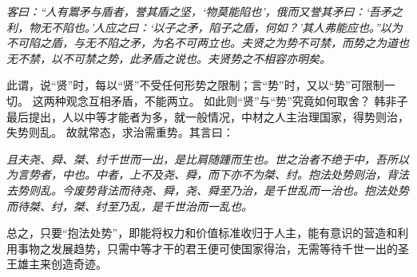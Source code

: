\documentclass[11pt]{article}
\begin{document}
\textit{客曰：“人有鬻矛与盾者，誉其盾之坚，‘物莫能陷也'，俄而又誉其矛曰：‘吾矛之利，物无不陷也。'人应之曰：‘以子之矛，陷子之盾，何如？'其人弗能应也。”以为不可陷之盾，与无不陷之矛，为名不可两立也。夫贤之为势不可禁，而势之为道也无不禁，以不可禁之势，此矛盾之说也。夫贤势之不相容亦明矣。}

此谓，说“贤”时，每以“贤”不受任何形势之限制；言“势”时，又以“势”可限制一切。
这两种观念互相矛盾，不能两立。
如此则“贤”与“势”究竟如何取舍？
韩非子最后提出，人以中等才能者为多，就一般情况，中材之人主治理国家，得势则治，失势则乱。
故就常态，求治需重势。其言曰：

\textit{且夫尧、舜、桀、纣千世而一出，是比肩随踵而生也。世之治者不绝于中，吾所以为言势者，中也。中者，上不及尧、舜，而下亦不为桀、纣。抱法处势则治，背法去势则乱。今废势背法而待尧、舜，尧、舜至乃治，是千世乱而一治也。抱法处势而待桀、纣，桀、纣至乃乱，是千世治而一乱也。}

总之，只要“抱法处势”，即能将权力和价值标准收归于人主，能有意识的营造和利用事物之发展趋势，只需中等才干的君王便可使国家得治，无需等待千世一出的圣王雄主来创造奇迹。
  
\end{document}
